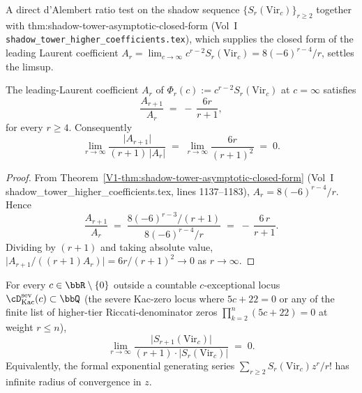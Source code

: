 A direct d'Alembert ratio test on the shadow sequence
$\{S_r(\mathrm{Vir}_c)\}_{r \ge 2}$ together with
\textsf{thm:shadow-tower-asymptotic-closed-form} (Vol~I
\texttt{shadow\_tower\_higher\_coefficients.tex}), which supplies the
closed form of the leading Laurent coefficient
$A_r = \lim_{c \to \infty} c^{r-2} S_r(\mathrm{Vir}_c) =
8 (-6)^{r-4} / r$, settles the limsup.

\begin{lemma}
\label{lem:leading-coefficient-ratio-identity}
The leading-Laurent coefficient $A_r$ of
$\Phi_r(c) := c^{r-2} S_r(\mathrm{Vir}_c)$ at $c = \infty$ satisfies
\[
 \frac{A_{r+1}}{A_r}
 \;=\;
 -\,\frac{6 r}{r+1},
\]
for every $r \ge 4$. Consequently
\[
 \lim_{r \to \infty}
 \frac{\lvert A_{r+1} \rvert}{(r+1)\,\lvert A_r \rvert}
 \;=\;
 \lim_{r \to \infty}
 \frac{6 r}{(r+1)^2}
 \;=\;
 0.
\]
\end{lemma}

\begin{proof}
From Theorem~\ref{V1-thm:shadow-tower-asymptotic-closed-form}
(Vol~I shadow\_tower\_higher\_coefficients.tex, lines 1137--1183),
$A_r = 8 (-6)^{r-4} / r$. Hence
\[
 \frac{A_{r+1}}{A_r}
 \;=\;
 \frac{8 (-6)^{r-3} / (r+1)}{8 (-6)^{r-4} / r}
 \;=\;
 -\,\frac{6\,r}{r+1}.
\]
Dividing by $(r+1)$ and taking absolute value,
$\lvert A_{r+1} / ((r+1) A_r) \rvert = 6r / (r+1)^2 \to 0$ as
$r \to \infty$.
\end{proof}

\begin{proposition}
\label{prop:virasoro-ratio-test}
For every $c \in \bbR \setminus \{0\}$ outside a countable
$c$-exceptional locus $\cD^{\mathrm{sev}}_{\mathrm{Kac}}(c) \subset \bbQ$
(the severe Kac-zero locus where $5 c + 22 = 0$ or any of the finite
list of higher-tier Riccati-denominator zeros $\prod_{k=2}^{n}(5c+22) =
0$ at weight $r \le n$),
\[
 \lim_{r \to \infty}
 \frac{\lvert S_{r+1}(\mathrm{Vir}_c) \rvert}
 {(r+1) \cdot \lvert S_r(\mathrm{Vir}_c) \rvert}
 \;=\;
 0.
\]
Equivalently, the formal exponential generating series
$\sum_{r \ge 2} S_r(\mathrm{Vir}_c) z^r / r!$ has infinite radius of
convergence in $z$.
\end{proposition}

